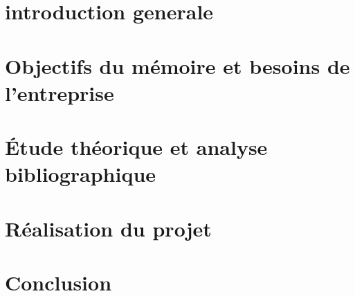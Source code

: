 \chapter{introduction generale}


\chapter{Objectifs du mémoire et besoins de l’entreprise}\label{chapter:objectifs_besoins}


\chapter{Étude théorique et analyse bibliographique}\label{chapter:etude_theorique}


\chapter{Réalisation du projet}\label{chapter:realisation_projet}


\chapter*{Conclusion}

